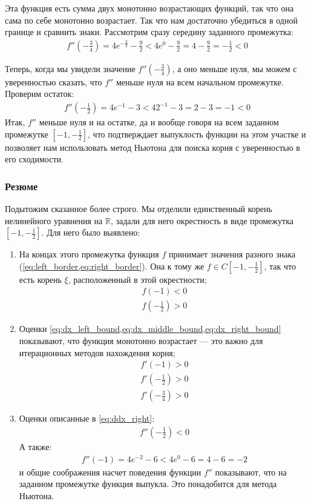 Эта функция есть сумма двух монотонно возрастающих функций, так что она сама по себе монотонно возрастает. Так что нам достаточно убедиться в одной границе и сравнить знаки.
Рассмотрим сразу середину заданного промежутка:
\begin{align}
  f''\left(-\frac{3}{4}\right) = 4 e^{-\frac{3}{2}} - \frac{9}{2} < 4 e^0 - \frac{9}{2} = 4 - \frac{9}{2} = -\frac{1}{2} < 0
\end{align}

Теперь, когда мы увидели значение \(f''\left(-\frac{3}{4}\right)\), а оно меньше нуля, мы можем с уверенностью сказать, что \(f''\) меньше нуля на всем начальном промежутке. Проверим остаток:
\begin{align}
  f''(-\frac{1}{2}) = 4 e^{-1} - 3 < 4 2^{-1} - 3 = 2 - 3 = -1 < 0 \label{eq:ddx_right}
\end{align}
Итак, \(f''\) меньше нуля и на остатке, да и вообще говоря на всем заданном промежутке \([-1, -\frac{1}{2}]\), что подтверждает выпуклость функции на этом участке и позволяет нам использовать метод Ньютона для поиска корня с уверенностью в его сходимости.

\subsubsection{Резюме}
Подытожим сказанное более строго. Мы отделили единственный корень нелинейного уравнения на \(\mathbb{R}\), задали для него окрестность в виде промежутка \([-1, -\frac{1}{2}]\). Для него было выявлено:
\begin{enumerate}
  \item На концах этого промежутка функция \(f\) принимает значения разного знака (\cref{eq:left_border,eq:right_border}). Она к тому же \(f \in C[-1, -\frac{1}{2}]\), так что есть корень \(\xi\), расположенный в этой окрестности;
  \begin{align*}
    f(-1) <  0 \\
    f\left(-\frac{1}{2}\right) > 0
  \end{align*}
  \item Оценки \cref{eq:dx_left_bound,eq:dx_middle_bound,eq:dx_right_bound} показывают, что функция монотонно возрастает --- это важно для итерационных методов нахождения корня;
\begin{align*} 
  f'(-1) > 0 \\ 
  f'\left(-\frac{1}{2}\right) > 0 \\ 
  f'\left(-\frac{3}{4}\right) > 0 
\end{align*}
  \item Оценки описанные в \cref{eq:ddx_right}:
    \begin{align*}
      f''(-\frac{1}{2}) < 0
    \end{align*} А также:
    \begin{align}
      f''(-1) = 4 e^{-2} - 6 < 4 e^0 - 6 = 4 - 6 = -2
    \end{align}
    и общие соображения насчет поведения функции \(f''\) показывают, что на заданном промежутке функция выпукла. Это понадобится для метода Ньютона.
\end{enumerate}

